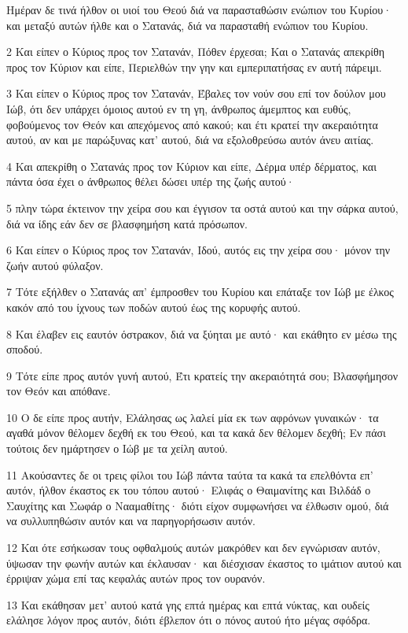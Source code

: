 \par Ημέραν δε τινά ήλθον οι υιοί του Θεού διά να παρασταθώσιν ενώπιον του Κυρίου· και μεταξύ αυτών ήλθε και ο Σατανάς, διά να παρασταθή ενώπιον του Κυρίου.
\par 2 Και είπεν ο Κύριος προς τον Σατανάν, Πόθεν έρχεσαι; Και ο Σατανάς απεκρίθη προς τον Κύριον και είπε, Περιελθών την γην και εμπεριπατήσας εν αυτή πάρειμι.
\par 3 Και είπεν ο Κύριος προς τον Σατανάν, Έβαλες τον νούν σου επί τον δούλον μου Ιώβ, ότι δεν υπάρχει όμοιος αυτού εν τη γη, άνθρωπος άμεμπτος και ευθύς, φοβούμενος τον Θεόν και απεχόμενος από κακού; και έτι κρατεί την ακεραιότητα αυτού, αν και με παρώξυνας κατ' αυτού, διά να εξολοθρεύσω αυτόν άνευ αιτίας.
\par 4 Και απεκρίθη ο Σατανάς προς τον Κύριον και είπε, Δέρμα υπέρ δέρματος, και πάντα όσα έχει ο άνθρωπος θέλει δώσει υπέρ της ζωής αυτού·
\par 5 πλην τώρα έκτεινον την χείρα σου και έγγισον τα οστά αυτού και την σάρκα αυτού, διά να ίδης εάν δεν σε βλασφημήση κατά πρόσωπον.
\par 6 Και είπεν ο Κύριος προς τον Σατανάν, Ιδού, αυτός εις την χείρα σου· μόνον την ζωήν αυτού φύλαξον.
\par 7 Τότε εξήλθεν ο Σατανάς απ' έμπροσθεν του Κυρίου και επάταξε τον Ιώβ με έλκος κακόν από του ίχνους των ποδών αυτού έως της κορυφής αυτού.
\par 8 Και έλαβεν εις εαυτόν όστρακον, διά να ξύηται με αυτό· και εκάθητο εν μέσω της σποδού.
\par 9 Τότε είπε προς αυτόν γυνή αυτού, Έτι κρατείς την ακεραιότητά σου; Βλασφήμησον τον Θεόν και απόθανε.
\par 10 Ο δε είπε προς αυτήν, Ελάλησας ως λαλεί μία εκ των αφρόνων γυναικών· τα αγαθά μόνον θέλομεν δεχθή εκ του Θεού, και τα κακά δεν θέλομεν δεχθή; Εν πάσι τούτοις δεν ημάρτησεν ο Ιώβ με τα χείλη αυτού.
\par 11 Ακούσαντες δε οι τρεις φίλοι του Ιώβ πάντα ταύτα τα κακά τα επελθόντα επ' αυτόν, ήλθον έκαστος εκ του τόπου αυτού· Ελιφάς ο Θαιμανίτης και Βιλδάδ ο Σαυχίτης και Σωφάρ ο Νααμαθίτης· διότι είχον συμφωνήσει να έλθωσιν ομού, διά να συλλυπηθώσιν αυτόν και να παρηγορήσωσιν αυτόν.
\par 12 Και ότε εσήκωσαν τους οφθαλμούς αυτών μακρόθεν και δεν εγνώρισαν αυτόν, ύψωσαν την φωνήν αυτών και έκλαυσαν· και διέσχισαν έκαστος το ιμάτιον αυτού και έρριψαν χώμα επί τας κεφαλάς αυτών προς τον ουρανόν.
\par 13 Και εκάθησαν μετ' αυτού κατά γης επτά ημέρας και επτά νύκτας, και ουδείς ελάλησε λόγον προς αυτόν, διότι έβλεπον ότι ο πόνος αυτού ήτο μέγας σφόδρα.

